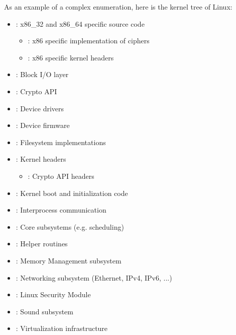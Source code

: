 As an example of a complex enumeration, here is
the kernel tree of Linux:
%
\begin{itemize}
	\item {\bf{}}: x86\_32 and x86\_64 specific source code
	\begin{itemize}
		\item {\bf{}}: x86 specific implementation of ciphers
		\item {\bf{}}: x86 specific kernel headers
	\end{itemize}
	\item {}: Block I/O layer
	\item {\bf{}}: Crypto API
	\item {}: Device drivers
	\item {}: Device firmware
	\item {}: Filesystem implementations
	\item {\bf{}}: Kernel headers
	\begin{itemize}
		\item {\bf{}}: Crypto API headers
	\end{itemize}
	\item {}: Kernel boot and initialization code
	\item {}: Interprocess communication
	\item {}: Core subsystems (e.g. scheduling)
	\item {}: Helper routines
	\item {}: Memory Management subsystem
	\item {}: Networking subsystem (Ethernet, IPv4, IPv6, ...)
	\item {}: Linux Security Module
	\item {}: Sound subsystem
	\item {}: Virtualization infrastructure
\end{itemize}

\Blindtext[2][1]